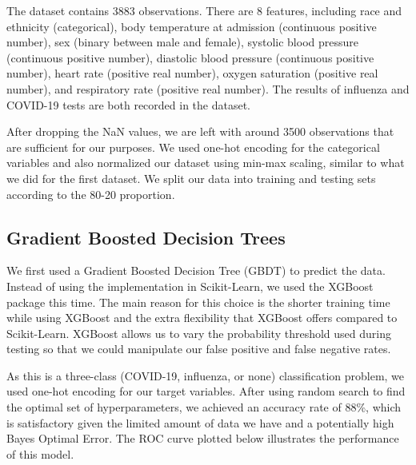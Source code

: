\documentclass[a4paper, 11pt]{article}
\begin{document}
The dataset contains 3883 observations. There are 8 features, including race and ethnicity (categorical), body temperature at admission (continuous positive number), sex (binary between male and female), systolic blood pressure (continuous positive number), diastolic blood pressure (continuous positive number), heart rate (positive real number), oxygen saturation (positive real number), and respiratory rate (positive real number). The results of influenza and COVID-19 tests are both recorded in the dataset. \par
After dropping the NaN values, we are left with around 3500 observations that are sufficient for our purposes. We used one-hot encoding for the categorical variables and also normalized our dataset using min-max scaling, similar to what we did for the first dataset. We split our data into training and testing sets according to the 80-20 proportion.\par


\subsection*{Gradient Boosted Decision Trees}

We first used a Gradient Boosted Decision Tree (GBDT) to predict the data. Instead of using the implementation in Scikit-Learn, we used the XGBoost package this time. The main reason for this choice is the shorter training time while using XGBoost and the extra flexibility that XGBoost offers compared to Scikit-Learn. XGBoost allows us to vary the probability threshold used during testing so that we could manipulate our false positive and false negative rates. \par 
As this is a three-class (COVID-19, influenza, or none) classification problem, we used one-hot encoding for our target variables. After using random search to find the optimal set of hyperparameters, we achieved an accuracy rate of 88\%, which is satisfactory given the limited amount of data we have and a potentially high Bayes Optimal Error. The ROC curve plotted below illustrates the performance of this model.
\end{document}
